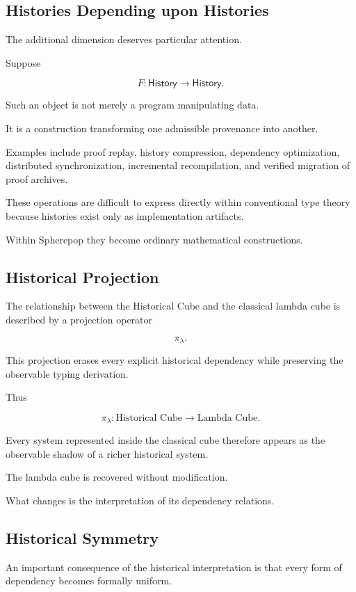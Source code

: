 \documentclass[12pt,oneside]{article}
\theoremstyle{definition}
\theoremstyle{remark}
\begin{document}
\subsection{Histories Depending upon Histories}

The additional dimension deserves particular attention.

Suppose

\[
F
:
\mathsf{History}
\rightarrow
\mathsf{History}.
\]

Such an object is not merely a program manipulating data.

It is a construction transforming one admissible provenance into another.

Examples include proof replay, history compression, dependency optimization,
distributed synchronization, incremental recompilation, and verified migration
of proof archives.

These operations are difficult to express directly within conventional type
theory because histories exist only as implementation artifacts.

Within Spherepop they become ordinary mathematical constructions.

\subsection{Historical Projection}

The relationship between the Historical Cube and the classical lambda cube is
described by a projection operator

\[
\pi_\lambda.
\]

This projection erases every explicit historical dependency while preserving the
observable typing derivation.

Thus

\[
\pi_\lambda
:
\text{Historical Cube}
\longrightarrow
\text{Lambda Cube}.
\]

Every system represented inside the classical cube therefore appears as the
observable shadow of a richer historical system.

The lambda cube is recovered without modification.

What changes is the interpretation of its dependency relations.

\subsection{Historical Symmetry}

An important consequence of the historical interpretation is that every form of
dependency becomes formally uniform.
\end{document}
